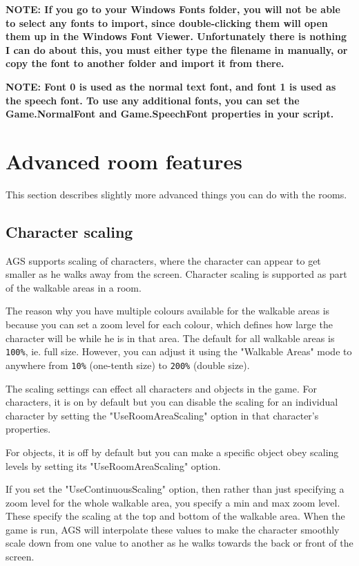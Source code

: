 \bf{NOTE:} If you go to your Windows Fonts folder, you will not be able to select
any fonts to import, since double-clicking them will open them up in the Windows Font
Viewer. Unfortunately there is nothing I can do about this, you must either type the
filename in manually, or copy the font to another folder and import it from there.

\bf{NOTE:} Font 0 is used as the normal text font, and font 1 is used as the
speech font. To use any additional fonts, you can set the Game.NormalFont
and Game.SpeechFont properties in your script.

\section{Advanced room features}%

This section describes slightly more advanced things you can do with the
rooms.

\subsection{Character scaling}%

AGS supports scaling of characters, where the character can appear to get
smaller as he walks away from the screen. Character scaling is supported as
part of the walkable areas in a room.

The reason why you have multiple colours available for the walkable areas is
because you can set a zoom level for each colour, which defines how large
the character will be while he is in that area. The default for all walkable
areas is \verb$100%$, ie. full size. However, you can adjust it using the "Walkable
Areas" mode to anywhere from \verb$10%$ (one-tenth size) to \verb$200%$ (double size).

The scaling settings can effect all characters and objects in the game. For characters,
it is on by default but you can disable the scaling for an individual character by
setting the "UseRoomAreaScaling" option in that character's properties.

For objects, it is off by default but you can make a specific object obey scaling
levels by setting its "UseRoomAreaScaling" option.

If you set the "UseContinuousScaling" option, then rather than just specifying a
zoom level for the whole walkable area, you specify a min and max zoom level. These
specify the scaling at the top and bottom of the walkable area. When the game is run,
AGS will interpolate these values to make the character smoothly scale down from
one value to another as he walks towards the back or front of the screen.

